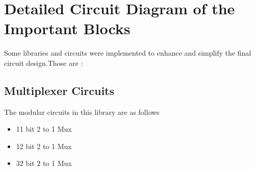 \documentclass[12pt]{article}
\begin{document}
\newpage






\section{\large{Detailed Circuit Diagram of the Important Blocks}}
Some libraries and circuits were implemented to enhance and simplify the final circuit design.Those are :

\subsection{Multiplexer Circuits}
The modular circuits in this library are as follows 
\begin{itemize}

    \item 11 bit 2 to 1 Mux 
    \item 12 bit 2 to 1 Mux 
    \item 32 bit 2 to 1 Mux 

\end{itemize}
\end{document}
